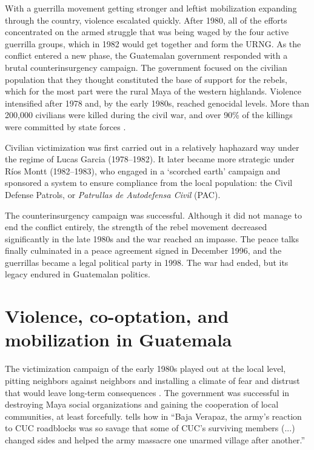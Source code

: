 \documentclass[12pt, notitlepage]{article}
\begin{document}
With a guerrilla movement getting stronger and leftist mobilization expanding through the country, violence escalated quickly.
After 1980, all of the efforts concentrated on the armed struggle that was being waged by the four active guerrilla groups, which in 1982 would get together and form the URNG.
As the conflict entered a new phase, the Guatemalan government responded with a brutal counterinsurgency campaign.
The government focused on the civilian population that they thought constituted the base of support for the rebels, which for the most part were the rural Maya of the western highlands.
Violence intensified after 1978 and, by the early 1980s, reached genocidal levels.
More than 200,000 civilians were killed during the civil war, and over 90\% of the killings were committed by state forces \citep{Ball:1999aa, CEH:1999aa}.
%
%
%

Civilian victimization was first carried out in a relatively haphazard way under the regime of Lucas Garcia (1978--1982).
It later became more strategic under Ríos Montt (1982--1983), who engaged in a `scorched earth' campaign and sponsored a system to ensure compliance from the local population: the Civil Defense Patrols, or \textit{Patrullas de Autodefensa Civil} (PAC).

The counterinsurgency campaign was successful.
Although it did not manage to end the conflict entirely, the strength of the rebel movement decreased significantly in the late 1980s and the war reached an impasse.
The peace talks finally culminated in a peace agreement signed in December 1996, and the guerrillas became a legal political party in 1998.
The war had ended, but its legacy endured in Guatemalan politics.

\section*{Violence, co-optation, and mobilization in Guatemala}

The victimization campaign of the early 1980s played out at the local level, pitting neighbors against neighbors and installing a climate of fear and distrust that would leave long-term consequences \citep{Burrell:2013aa}.
The government was successful in destroying Maya social organizations and gaining the cooperation of local communities, at least forcefully.
\citet[101]{Stoll:1999aa} tells how in ``Baja Verapaz, the army's reaction to CUC roadblocks was so savage that some of CUC's surviving members (...) changed sides and helped the army massacre one unarmed village after another.''
\end{document}
